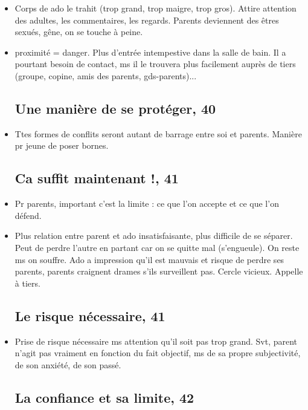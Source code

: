 \documentclass[12pt]{report}
\begin{document}
\begin{itemize}
\item Corps de ado le trahit (trop grand, trop maigre, trop gros). Attire attention des adultes, les commentaires, les regards. Parents deviennent des êtres sexués, gêne, on se touche à peine.\\

\item proximité = danger. Plus d'entrée intempestive dans la salle de bain. Il a pourtant besoin de contact, ms il le trouvera plus facilement auprès de tiers (groupe, copine, amis des parents, gds-parents)...

\subsection{Une manière de se protéger, 40}


\item Ttes formes de conflits seront autant de barrage entre soi et parents. Manière pr jeune de poser bornes.

\subsection{Ca suffit maintenant !, 41}

\item Pr parents, important c'est la limite : ce que l'on accepte et ce que l'on défend.\\

\item Plus relation entre parent et ado insatisfaisante, plus difficile de se séparer. Peut de perdre l'autre en partant car on se quitte mal (s'engueule).  On reste ms on souffre. Ado a impression qu'il est mauvais et risque de perdre ses parents, parents craignent drames s'ils surveillent pas. Cercle vicieux. Appelle à tiers. 

\subsection{Le risque nécessaire, 41}

\item Prise de risque nécessaire ms attention qu'il soit pas trop grand. Svt, parent n'agit pas vraiment en fonction du fait objectif, ms de sa propre subjectivité, de son anxiété, de son passé. 

\subsection{La confiance et sa limite, 42}


\end{itemize}
\end{document}
